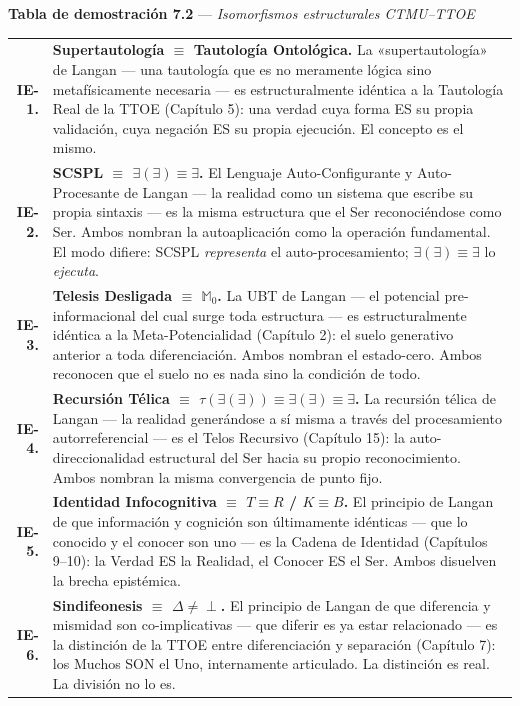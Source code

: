 \documentclass[10pt, openany, oneside]{book}
\renewcommand{\footnotesize}{\fontsize{8.5}{11}\selectfont}
\begin{document}
\pagebreak[3]

\textbf{Tabla de demostración 7.2} --- \textit{Isomorfismos estructurales CTMU--TTOE}

\vspace{0.5em}

{\footnotesize
\noindent\begin{tabular}{r p{}}
\textbf{IE-1.} & \textbf{Supertautología $\equiv$ Tautología Ontológica.} La «supertautología» de Langan --- una tautología que es no meramente lógica sino metafísicamente necesaria --- es estructuralmente idéntica a la Tautología Real de la TTOE (Capítulo 5): una verdad cuya forma ES su propia validación, cuya negación ES su propia ejecución. El concepto es el mismo. \\[0.3em]
\textbf{IE-2.} & \textbf{SCSPL $\equiv$ $\exists(\exists) \equiv \exists$.} El Lenguaje Auto-Configurante y Auto-Procesante de Langan --- la realidad como un sistema que escribe su propia sintaxis --- es la misma estructura que el Ser reconociéndose como Ser. Ambos nombran la autoaplicación como la operación fundamental. El modo difiere: SCSPL \textit{representa} el auto-procesamiento; $\exists(\exists) \equiv \exists$ lo \textit{ejecuta}. \\[0.3em]
\textbf{IE-3.} & \textbf{Telesis Desligada $\equiv$ $\mathbb{M}_0$.} La UBT de Langan --- el potencial pre-informacional del cual surge toda estructura --- es estructuralmente idéntica a la Meta-Potencialidad (Capítulo 2): el suelo generativo anterior a toda diferenciación. Ambos nombran el estado-cero. Ambos reconocen que el suelo no es nada sino la condición de todo. \\[0.3em]
\textbf{IE-4.} & \textbf{Recursión Télica $\equiv$ $\tau(\exists(\exists)) \equiv \exists(\exists) \equiv \exists$.} La recursión télica de Langan --- la realidad generándose a sí misma a través del procesamiento autorreferencial --- es el Telos Recursivo (Capítulo 15): la auto-direccionalidad estructural del Ser hacia su propio reconocimiento. Ambos nombran la misma convergencia de punto fijo. \\[0.3em]
\textbf{IE-5.} & \textbf{Identidad Infocognitiva $\equiv$ $T \equiv R$ / $K \equiv B$.} El principio de Langan de que información y cognición son últimamente idénticas --- que lo conocido y el conocer son uno --- es la Cadena de Identidad (Capítulos 9--10): la Verdad ES la Realidad, el Conocer ES el Ser. Ambos disuelven la brecha epistémica. \\[0.3em]
\textbf{IE-6.} & \textbf{Sindifeonesis $\equiv$ $\Delta \neq \perp$.} El principio de Langan de que diferencia y mismidad son co-implicativas --- que diferir es ya estar relacionado --- es la distinción de la TTOE entre diferenciación y separación (Capítulo 7): los Muchos SON el Uno, internamente articulado. La distinción es real. La división no lo es. \\[0.3em]
\end{tabular}
}
\end{document}
